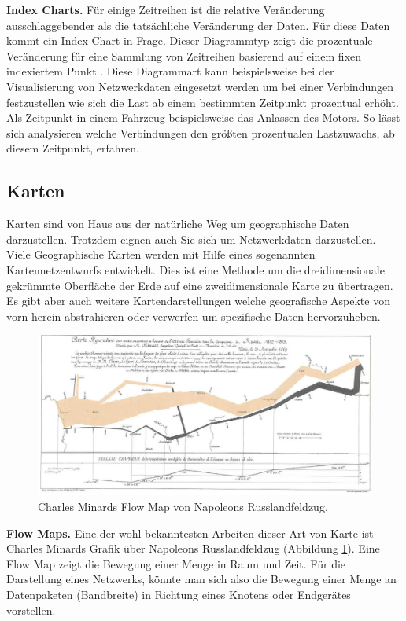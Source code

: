 \documentclass[draft=false
              ,paper=a4
              ,twoside=false
              ,fontsize=11pt
              ,headsepline
              ,BCOR10mm
              ,DIV11
              ]{scrbook}
\begin{document}
\textbf{Index Charts.} Für einige Zeitreihen ist die relative Veränderung ausschlaggebender als die tatsächliche Veränderung der Daten. Für diese Daten kommt ein Index Chart in Frage. Dieser Diagrammtyp zeigt die prozentuale Veränderung für eine Sammlung von Zeitreihen basierend auf einem fixen indexiertem Punkt \cite{heer_tour_2010}. Diese Diagrammart kann beispielsweise bei der Visualisierung von Netzwerkdaten eingesetzt werden um bei einer Verbindungen festzustellen wie sich die Last ab einem bestimmten Zeitpunkt prozentual erhöht. Als Zeitpunkt in einem Fahrzeug beispielsweise das Anlassen des Motors. So lässt sich analysieren welche Verbindungen den größten prozentualen Lastzuwachs, ab diesem Zeitpunkt, erfahren.

\subsection{Karten} %
\label{ssub:karten}
Karten sind von Haus aus der natürliche Weg um geographische Daten darzustellen. Trotzdem eignen auch Sie sich um Netzwerkdaten darzustellen. Viele Geographische Karten werden mit Hilfe eines sogenannten Kartennetzentwurfs entwickelt. Dies ist eine Methode um die dreidimensionale gekrümmte Oberfläche der Erde auf eine zweidimensionale Karte zu übertragen. Es gibt aber auch weitere Kartendarstellungen welche geografische Aspekte von vorn herein abstrahieren oder verwerfen um spezifische Daten hervorzuheben.

\begin{figure}[h]
  \centering
  \includegraphics[width=\textwidth]{img/napoleon}
  \caption{Charles Minards Flow Map von Napoleons Russlandfeldzug.}
  \label{fig:nap}
 \end{figure} 
\textbf{Flow Maps.} Eine der wohl bekanntesten Arbeiten dieser Art von Karte ist Charles Minards Grafik über Napoleons Russlandfeldzug (Abbildung \ref{fig:nap}). Eine Flow Map zeigt die Bewegung einer Menge in Raum und Zeit. Für die Darstellung eines Netzwerks, könnte man sich also die Bewegung einer Menge an Datenpaketen (Bandbreite) in Richtung eines Knotens oder Endgerätes vorstellen. 
\end{document}
